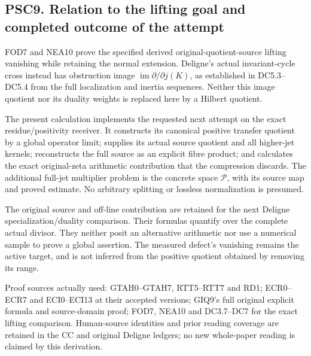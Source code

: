 \subsection{PSC9. Relation to the lifting goal and completed outcome of
the
attempt}\label{psc9.-relation-to-the-lifting-goal-and-completed-outcome-of-the-attempt}

FOD7 and NEA10 prove the specified derived original-quotient-source
lifting vanishing while retaining the normal extension. Deligne's actual
invariant-cycle cross instead has obstruction image
\(\operatorname{im}\partial/\partial j(K)\), as established in
DC5.3--DC5.4 from the full localization and inertia sequences. Neither
this image quotient nor its duality weights is replaced here by a
Hilbert quotient.

The present calculation implements the requested next attempt on the
exact residue/positivity receiver. It constructs its canonical positive
transfer quotient by a global operator limit; supplies its actual source
quotient and all higher-jet kernels; reconstructs the full source as an
explicit fibre product; and calculates the exact original-zeta
arithmetic contribution that the compression discards. The additional
full-jet multiplier problem is the concrete space \(\mathscr P\), with
its source map and proved estimate. No arbitrary splitting or lossless
normalization is presumed.

The original source and off-line contribution are retained for the next
Deligne specialization/duality comparison. Their formulas quantify over
the complete actual divisor. They neither posit an alternative
arithmetic nor use a numerical sample to prove a global assertion. The
measured defect's vanishing remains the active target, and is not
inferred from the positive quotient obtained by removing its range.

Proof sources actually used: GTAH0--GTAH7, RTT5--RTT7 and RD1;
ECR0--ECR7 and ECI0--ECI13 at their accepted versions; GIQ9's full
original explicit formula and source-domain proof; FOD7, NEA10 and
DC3.7--DC7 for the exact lifting comparison. Human-source identities and
prior reading coverage are retained in the CC and original Deligne
ledgers; no new whole-paper reading is claimed by this derivation.
